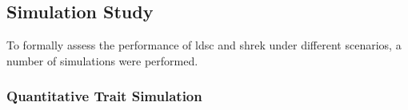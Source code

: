 \documentclass[12pt]{scrbook}
\begin{document}
\subsection{Simulation Study}
To formally assess the performance of \gls{ldsc} and \gls{shrek} under different scenarios, a number of simulations were performed.

\subsubsection{Quantitative Trait Simulation}
\begin{figure}
	\centering
\end{figure}
\end{document}
